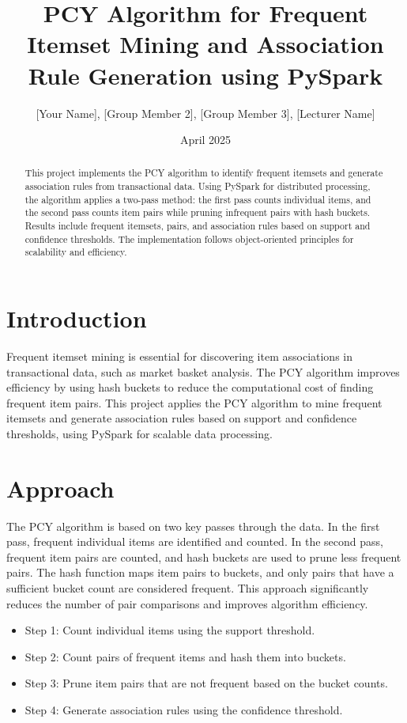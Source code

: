 \documentclass{article}
\title{PCY Algorithm for Frequent Itemset Mining and Association Rule Generation using PySpark}
\author{[Your Name], [Group Member 2], [Group Member 3], [Lecturer Name]}
\date{April 2025}
\begin{document}
\maketitle

\begin{abstract}
This project implements the PCY algorithm to identify frequent itemsets and generate association rules from transactional data. Using PySpark for distributed processing, the algorithm applies a two-pass method: the first pass counts individual items, and the second pass counts item pairs while pruning infrequent pairs with hash buckets. Results include frequent itemsets, pairs, and association rules based on support and confidence thresholds. The implementation follows object-oriented principles for scalability and efficiency.
\end{abstract}

\section{Introduction}
Frequent itemset mining is essential for discovering item associations in transactional data, such as market basket analysis. The PCY algorithm improves efficiency by using hash buckets to reduce the computational cost of finding frequent item pairs. This project applies the PCY algorithm to mine frequent itemsets and generate association rules based on support and confidence thresholds, using PySpark for scalable data processing.

\section{Approach}
The PCY algorithm is based on two key passes through the data. In the first pass, frequent individual items are identified and counted. In the second pass, frequent item pairs are counted, and hash buckets are used to prune less frequent pairs. The hash function maps item pairs to buckets, and only pairs that have a sufficient bucket count are considered frequent. This approach significantly reduces the number of pair comparisons and improves algorithm efficiency.

\begin{itemize}
    \item Step 1: Count individual items using the support threshold.
    \item Step 2: Count pairs of frequent items and hash them into buckets.
    \item Step 3: Prune item pairs that are not frequent based on the bucket counts.
    \item Step 4: Generate association rules using the confidence threshold.
\end{itemize}
\end{document}
